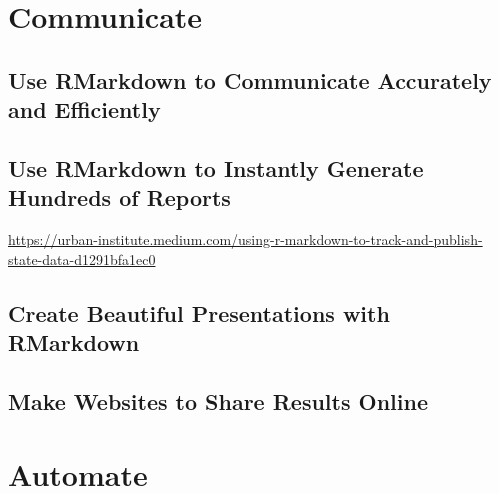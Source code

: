 \documentclass[
]{book}
\begin{document}
\hypertarget{part-communicate}{%
\part*{Communicate}\label{part-communicate}}

\hypertarget{use-rmarkdown-to-communicate-accurately-and-efficiently}{%
\chapter*{Use RMarkdown to Communicate Accurately and Efficiently}\label{use-rmarkdown-to-communicate-accurately-and-efficiently}}

\hypertarget{use-rmarkdown-to-instantly-generate-hundreds-of-reports}{%
\chapter*{Use RMarkdown to Instantly Generate Hundreds of Reports}\label{use-rmarkdown-to-instantly-generate-hundreds-of-reports}}

\url{https://urban-institute.medium.com/using-r-markdown-to-track-and-publish-state-data-d1291bfa1ec0}

\hypertarget{create-beautiful-presentations-with-rmarkdown}{%
\chapter*{Create Beautiful Presentations with RMarkdown}\label{create-beautiful-presentations-with-rmarkdown}}

\hypertarget{make-websites-to-share-results-online}{%
\chapter*{Make Websites to Share Results Online}\label{make-websites-to-share-results-online}}

\hypertarget{part-automate}{%
\part*{Automate}\label{part-automate}}
\end{document}
